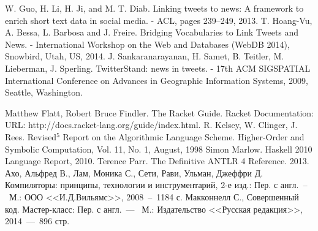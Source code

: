 \documentclass[12pt,a4paper,oneside]{extarticle}
\begin{document}
\begin{thebibliography}{0}
     W. Guo, H. Li, H. Ji, and M. T. Diab. Linking tweets to news: A framework to enrich short text data in social media. - ACL, pages 239–249, 2013.
     T. Hoang-Vu, A. Bessa, L. Barbosa and J. Freire. Bridging Vocabularies to Link Tweets and News. - International Workshop on the Web and Databases (WebDB 2014), Snowbird, Utah, US, 2014.
     J. Sankaranarayanan, H. Samet, B. Teitler, M. Lieberman, J. Sperling. TwitterStand: news in tweets. - 17th ACM SIGSPATIAL International Conference on Advances in Geographic Information Systems, 2009, Seattle, Washington.

    \hrulefill

     Matthew Flatt, Robert Bruce Findler. The Racket Guide. Racket Documentation: URL: http://docs.racket-lang.org/guide/index.html.
     R. Kelsey, W. Clinger, J. Rees. Revised$^5$ Report on the Algorithmic Language Scheme. Higher-Order and Symbolic Computation, Vol. 11, No. 1, August, 1998
     Simon Marlow. Haskell 2010 Language Report, 2010.
     Terence Parr. The Definitive ANTLR 4 Reference. 2013.
     Ахо, Альфред В., Лам, Моника С., Сети, Рави, Ульман, Джеффри Д. Компиляторы: принципы, технологии и инструментарий, 2-е изд.: Пер. с англ.~--~М.: ООО <<И.Д.Вильямс>>, 2008~--~1184 с.
     Макконнелл С., Совершенный код. Мастер-класс: Пер. с англ.~---~ М.: Издательство <<Русская редакция>>, 2014~---~896 стр.        
\end{thebibliography}
\end{document}
